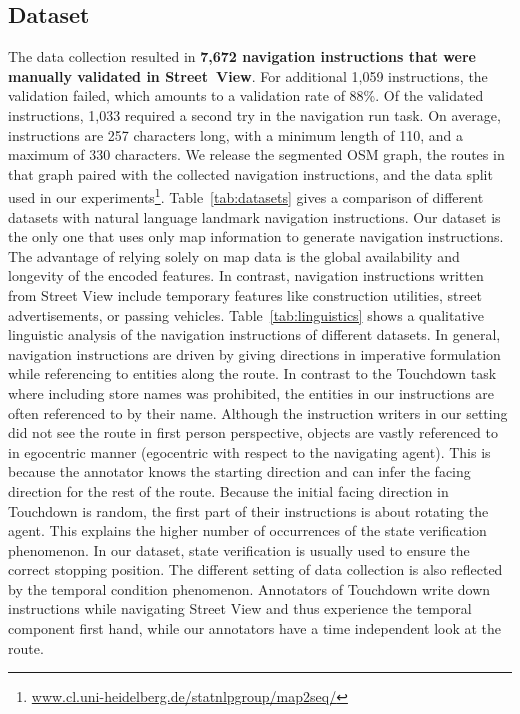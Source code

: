 \documentclass[11pt,a4paper]{article}
\begin{document}
\subsection{Dataset}
\label{sec:dataset}
The data collection resulted in \textbf{7,672 navigation instructions that were manually validated in Street~View}. For additional 1,059 instructions, the validation failed, which amounts to a validation rate of 88\%. Of the validated instructions, 1,033 required a second try in the navigation run task. On average, instructions are 257 characters long, with a minimum length of 110, and a maximum of 330 characters. We release the segmented OSM graph, the routes in that graph paired with the collected navigation instructions, and the data split used in our experiments\footnote{\url{www.cl.uni-heidelberg.de/statnlpgroup/map2seq/}}.
Table~\ref{tab:datasets} gives a comparison of different datasets with natural language landmark navigation instructions. Our dataset is the only one that uses only map information to generate navigation instructions. The advantage of relying solely on map data is the global availability and longevity of the encoded features. In contrast, navigation instructions written from Street View include temporary features like construction utilities, street advertisements, or passing vehicles.
Table~\ref{tab:linguistics} shows a qualitative linguistic analysis of the navigation instructions of different datasets. In general, navigation instructions are driven by giving directions in imperative formulation while referencing to entities along the route. In contrast to the Touchdown task where including store names was prohibited, the entities in our instructions are often referenced to by their name. Although the instruction writers in our setting did not see the route in first person perspective, objects are vastly referenced to in egocentric manner (egocentric with respect to the navigating agent). This is because the annotator knows the starting direction and can infer the facing direction for the rest of the route. Because the initial facing direction in Touchdown is random, the first part of their instructions is about rotating the agent. This explains the higher number of occurrences of the state verification phenomenon. In our dataset, state verification is usually used to ensure the correct stopping position. The different setting of data collection is also reflected by the temporal condition phenomenon. Annotators of Touchdown write down instructions while navigating Street View and thus experience the temporal component first hand, while our annotators have a time independent look at the route. 
\end{document}
